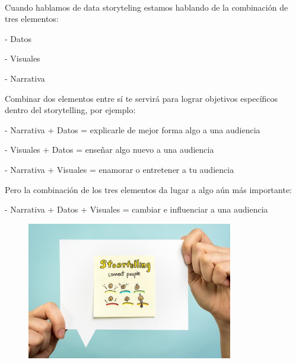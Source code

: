 \documentclass[a4paper,12pt,twocolumn]{article}
\begin{document}
\begin{center}
\caption\textbf{Los tres elementos del data storytelling}
\end{center}
\\

\item Cuando hablamos de data storyteling estamos hablando de la combinación de tres elementos:

\item - Datos
\item - Visuales
\item - Narrativa

\item Combinar dos elementos entre sí te servirá para lograr objetivos específicos dentro del storytelling, por ejemplo:

\item - Narrativa + Datos = explicarle de mejor forma algo a una audiencia\\

\item - Visuales + Datos = enseñar algo nuevo a una audiencia\\

\item - Narrativa + Visuales = enamorar o entretener a tu audiencia\\

\item Pero la combinación de los tres elementos da lugar a algo aún más importante:

\item - Narrativa + Datos + Visuales = cambiar e influenciar a una audiencia

\begin{figure}[h!]
\centering
\includegraphics[width=9cm]{./Imagenes/Ejemplo2}
\end{figure}
\end{document}
